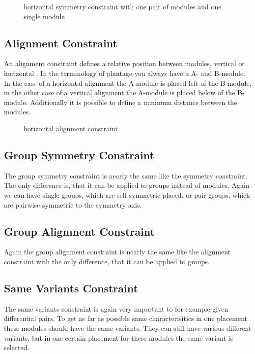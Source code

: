 \begin{figure}
	\centering
	
	\caption{horizontal symmetry constraint with one pair of modules and one single module}
	\label{fig:constraint_symmetry}
\end{figure}

\subsection{Alignment Constraint}
An alignment constraint defines a relative position between modules, vertical or horizontal . In the terminology of plantage you always have a A- and B-module. In the case of a horizontal alignment the A-module is placed left of the B-module, in the other case of a vertical alignment the A-module is placed below of the B-module. Additionally it is possible to define a minimum distance between the modules.

\begin{figure}
	\centering
	
	\caption{horizontal alignment constraint}
	\label{fig:constraint_alignment}
\end{figure}

\subsection{Group Symmetry Constraint}
The group symmetry constraint is nearly the same like the symmetry constraint. The only difference is, that it can be applied to groups instead of modules. Again we can have single groups, which are self symmetric placed, or pair groups, which are pairwise symmetric to the symmetry axis.

\subsection{Group Alignment Constraint}
Again the group alignment constraint is nearly the same like the alignment constraint with the only difference, that it can be applied to groups.

\subsection{Same Variants Constraint}
The same variants constraint is again very important to for example given differential pairs. To get as far as possible same characterisitics in one placement these modules should have the same variants. They can still have various different variants, but in one certain placement for these modules the same variant is selected.

